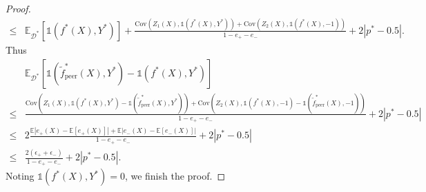 \documentclass[final]{cvpr}
\newcommand{\BR}{\mathds 1}
\newcommand{\E}{\mathbb E}
\begin{document}
\begin{proof}
\begin{equation*}
\begin{split}
    \le &  \E_{\mathcal D^*} \left[ \BR(f^*(X),Y^*)  \right]+ \frac{\text{Cov}(Z_1(X),\BR(f^*(X),Y^*)) + \text{Cov}(Z_2(X),\BR(f^*(X),-1))}{1-e_+-e_-} + 2|p^*-0.5|.
    \end{split}
\end{equation*}Thus 
\begin{equation*}
    \begin{split}
        & \E_{\mathcal D^*} \left[ \BR(\tilde f^*_{\text{peer}}(X),Y^*) - \BR(f^*(X),Y^*)  \right] \\
    \le & \frac{\text{Cov}(Z_1(X),\BR(f^*(X),Y^*)-\BR(\tilde f^*_{\text{peer}}(X),Y^*)) + \text{Cov}(Z_2(X),\BR(f^*(X),-1)-\BR(\tilde f^*_{\text{peer}}(X),-1))}{1-e_+-e_-} + 2|p^*-0.5| \\
    \le & 2 \frac{\E|e_+(X)-\E[e_+(X)]|+\E|e_-(X)-\E[e_-(X)]| }{1-e_+-e_-} + 2|p^*-0.5| \\
    \le & \frac{2(\epsilon_+ + \epsilon_-)}{1-e_+-e_-} + 2|p^*-0.5|.
    \end{split}
\end{equation*}
Noting $\BR(f^*(X),Y^*) =0$, we finish the proof.

\end{proof}
\end{document}
